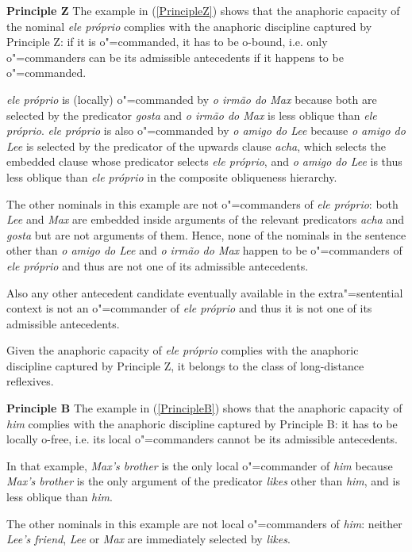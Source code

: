\documentclass[output=paper
	        ,collection
	        ,collectionchapter
 	        ,biblatex
                ,babelshorthands
                ,newtxmath
                ,draftmode
                ,colorlinks, citecolor=brown
]{langscibook}
\begin{document}
{\bf Principle Z} The example in (\ref{PrincipleZ}) shows that the anaphoric capacity of 
the  nominal {\em ele pr\'{o}prio} complies with 
the anaphoric discipline captured by Principle Z: if it is o"=commanded, it has to be o-bound, 
i.e. only o"=commanders can be its admissible antecedents if it happens to be o"=commanded.

{\em ele pr\'{o}prio} is (locally) o"=commanded by {\em o irm\~{a}o do Max} because both are selected 
by the predicator {\em gosta} and {\em o irm\~{a}o do Max} is less oblique than {\em ele pr\'{o}prio}.
{\em ele pr\'{o}prio} is also o"=commanded
by {\em o amigo do Lee} because {\em o amigo do Lee} is selected by the predicator of the upwards
clause {\em acha}, which selects the embedded clause whose predicator selects
{\em ele pr\'{o}prio}, and {\em o amigo do Lee} is thus less oblique than {\em ele pr\'{o}prio}
in the composite obliqueness hierarchy. 

The other nominals in this example are not o"=commanders of {\em ele pr\'{o}prio}: both
{\em Lee} and {\em Max} are embedded inside arguments of the relevant predicators {\em acha}
and {\em gosta} but are not arguments of them. Hence, none of
the nominals in the sentence other than {\em o amigo do Lee} and  {\em o irm\~{a}o do Max} happen 
to be o"=commanders of {\em ele pr\'{o}prio} and thus are not one of its admissible antecedents.

Also any other antecedent candidate eventually available in the extra"=sentential context is not
an o"=commander of {\em ele pr\'{o}prio} and thus it is not one of its admissible antecedents.

Given the anaphoric capacity of {\em ele pr\'{o}prio} complies with  the anaphoric discipline captured 
by Principle Z, it belongs to the class of long-distance reflexives.


{\bf Principle B} The example in (\ref{PrincipleB}) shows that the anaphoric capacity of {\em him} complies with 
the anaphoric discipline captured by Principle B: it has to be locally o-free, i.e. its local o"=commanders cannot
be its admissible antecedents.

In that example, {\em Max's brother} is the only local
o"=commander of {\em him} because {\em Max's brother} is the only argument of the predicator {\em likes} other than {\em him},
and is less oblique than {\em him}.

The other nominals in this example are not local o"=commanders of {\em him}: neither {\em Lee's friend},
{\em Lee} or {\em Max} are immediately selected by {\em likes}.
\end{document}
